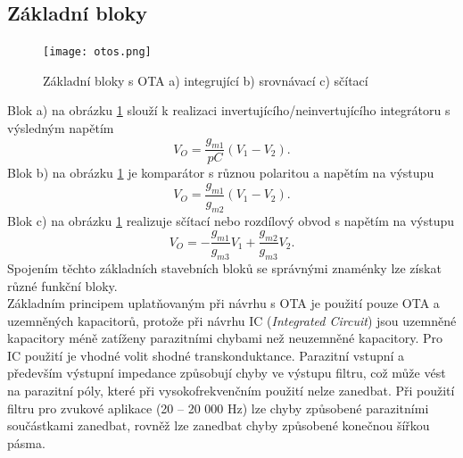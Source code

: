 \subsection{Základní bloky}
\begin{figure}[h]
\centering
\texttt{[image: otos.png]}
\caption[Základní bloky s OTA]{Základní bloky s OTA a) integrující b) srovnávací c) sčítací \cite{12} \label{s:BLO}}
\end{figure}
\noindent Blok a) na obrázku \ref{s:BLO} slouží k realizaci invertujícího/neinvertujícího integrátoru s výsledným napětím
\begin{equation}
V_O = \frac{g_{m1}}{pC}(V_1 - V_2).
\end{equation}
Blok b) na obrázku \ref{s:BLO} je komparátor s různou polaritou a napětím na výstupu
\begin{equation}
V_O = \frac{g_{m1}}{g_{m2}}(V_1 - V_2).
\end{equation}
Blok c) na obrázku \ref{s:BLO} realizuje sčítací nebo rozdílový obvod s napětím na výstupu
\begin{equation}
V_O = -\frac{g_{m1}}{g_{m3}}V_1 + \frac{g_{m2}}{g_{m3}}V_2.
\end{equation}
\noindent Spojením těchto základních stavebních bloků se správnými znaménky lze získat různé funkční bloky.\\
Základním principem uplatňovaným při návrhu s OTA je použití pouze OTA a uzemněných kapacitorů, protože při návrhu IC (\textit{Integrated Circuit}) jsou uzemněné kapacitory méně zatíženy parazitními chybami než neuzemněné kapacitory. Pro IC použití je vhodné volit shodné transkonduktance. Parazitní vstupní a především výstupní impedance způsobují chyby ve výstupu filtru, což může vést na parazitní póly, které při vysokofrekvenčním použití nelze zanedbat. Při použití filtru pro zvukové aplikace (20 -- 20 000 Hz) lze chyby způsobené parazitními součástkami zanedbat, rovněž lze zanedbat chyby způsobené konečnou šířkou pásma.
